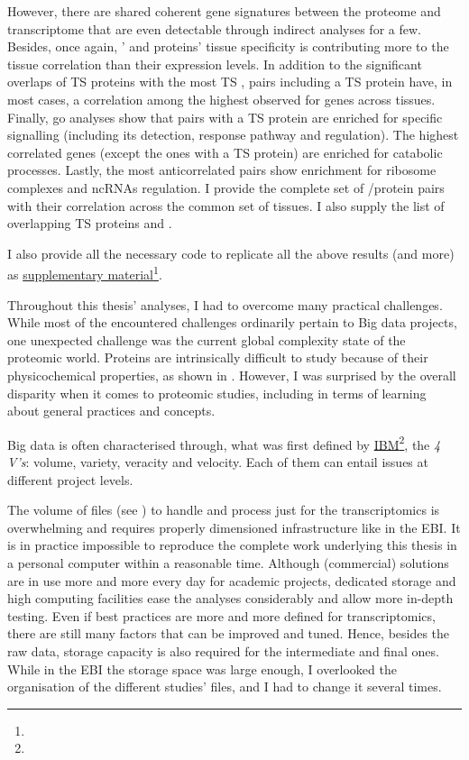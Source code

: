 However, there are shared coherent gene signatures
between the proteome and transcriptome
that are even detectable through indirect analyses for a few.
Besides, once again,
\mRNAs{}' and proteins' tissue specificity is contributing
more to the tissue correlation than their expression levels.
In addition to the significant overlaps of \gls{TS} proteins
with the most \gls{TS} \mRNAs,
pairs including a \gls{TS} protein have,
in most cases,
a correlation among the highest observed for genes across tissues.
Finally, \gls{go} analyses show that pairs with a \gls{TS} protein
are enriched for specific signalling
(including its detection, response pathway and regulation).
The highest correlated genes (except the ones with a \gls{TS} protein) are
enriched for catabolic processes.
Lastly, the most anticorrelated pairs show enrichment
for ribosome complexes and \glspl{ncRNA} regulation.
I provide the complete set of \mRNA/protein pairs with their correlation
across the common set of tissues.
I also supply the list of overlapping \gls{TS} proteins and \mRNAs{}.

I also provide all the necessary code to replicate all the above results (and more)
as \href{https://github.com/barzine/BaselineAtlas/tree/thesis.}{supplementary
material}\footnote{}.


Throughout this thesis' analyses,
I had to overcome many practical challenges.
While most of the encountered challenges ordinarily pertain to Big data projects,
one unexpected challenge was
the current global complexity state of the proteomic world.
Proteins are intrinsically difficult to study
because of their physicochemical properties,
as shown in .
However, I was surprised by the overall disparity
when it comes to proteomic studies,
including in terms of learning about general practices and concepts.

Big data is often characterised through, what was first defined by
\href{https://www.ibm.com}{IBM}\footnote{},
the \emph{4 V's}: volume, variety, veracity and velocity.
Each of them can entail issues at different project levels.

The volume of files (see )
to handle and process just for the transcriptomics
is overwhelming and requires properly dimensioned infrastructure
like in the \gls{EBI}.
It is in practice impossible to reproduce the complete work underlying
this thesis in a personal computer within a reasonable time.
Although (commercial) solutions are in use more and more every day
for academic projects,
dedicated storage and high computing facilities ease the analyses considerably
and allow more in-depth testing.
Even if best practices are more and more defined for transcriptomics,
there are still many factors that can be improved and tuned.
Hence, besides the raw data,
storage capacity is also required for the intermediate and final ones.
While in the \gls{EBI} the storage space was large enough,
I overlooked the organisation of the different studies' files,
and I had to change it several times.

